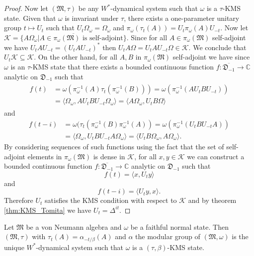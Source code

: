 \begin{proof}
Now let $(\mathfrak{M},\tau)$ be any $W^*$-dynamical system such that $\omega$ is a $\tau$-KMS state. Given that $\omega$ is invariant under $\tau$, there exists a one-parameter unitary group $t\mapsto U_t$ such that $U_t\Omega_\omega=\Omega_\omega$ and $\pi_\omega(\tau_t(A))=U_t\pi_\omega(A)U_{-t}$. Now let $\mathcal{K}=\overline{\{A\Omega_\omega|A\in\pi_\omega(\mathfrak{M})\text{ is self-adjoint}\}}$. Since for all $A\in\pi_\omega(\mathfrak{M})$ self-adjoint we have $U_tAU_{-t}=(U_tAU_{-t})^*$ then $U_tA\Omega=U_tAU_{-t}\Omega\in\mathcal{K}$. We conclude that $U_t\mathcal{K}\subseteq\mathcal{K}$. On the other hand, for all $A,B$ in $\pi_\omega(\mathfrak{M})$ self-adjoint we have since $\omega$ is an $\tau$-KMS state that there exists a bounded continuous function $f:\overline{\mathfrak{D}_{-1}}\rightarrow\mathbb{C}$ analytic on $\mathfrak{D}_{-1}$ such that
\begin{align}
\begin{split}
f(t)&=\omega(\pi_\omega^{-1}(A)\tau_t(\pi_\omega^{-1}(B))) = \omega(\pi_\omega^{-1}(AU_tBU_{-t})) \\
&=\langle\Omega_\omega,AU_tBU_{-t}\Omega_\omega\rangle = \langle A\Omega_\omega,U_tB\Omega\rangle
\end{split}
\end{align}
and
\begin{align}
f(t-i) &=\omega(\tau_t(\pi_\omega^{-1}(B)\pi_\omega^{-1}(A)) = \omega(\pi_\omega^{-1}(U_tBU_{-t}A)) \\
&=\langle \Omega_\omega, U_tBU_{-t}A\Omega_\omega\rangle = \langle U_tB\Omega_\omega, A\Omega_\omega\rangle.
\end{align}
By considering sequences of such functions using the fact that the set of self-adjoint elements in $\pi_\omega(\mathfrak{M})$ is dense in $\mathcal{K}$, for all $x,y\in\mathcal{K}$ we can construct a bounded continuous function $f:\overline{\mathfrak{D}_{-1}}\rightarrow\mathbb{C}$ analytic on $\mathfrak{D}_{-1}$ such that
\begin{equation}
f(t)=\langle x,U_t y\rangle
\end{equation}
and
\begin{equation}
f(t-i) = \langle U_t y,x\rangle.
\end{equation}
Therefore $U_t$ satisfies the KMS condition with respect to $\mathcal{K}$ and by theorem \ref{thm:KMS_Tomita} we have $U_t=\Delta^{it}$.
\end{proof}

\begin{corollary}\label{thm:final}
Let $\mathfrak{M}$ be a von Neumann algebra and $\omega$ be a faithful normal state. Then $(\mathfrak{M},\tau)$ with $\tau_t(A) = \alpha_{-t/\beta}(A)$ and $\alpha$ the modular group of $(\mathfrak{M},\omega)$ is the unique $W^*$-dynamical system such that $\omega$ is a $(\tau,\beta)$-KMS state.
\end{corollary}

